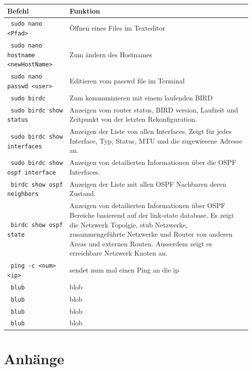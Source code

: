 \documentclass[11pt,titlepage]{article}
\begin{document}
\par\medskip 

\begin{tabular}{ |p{4cm}|p{10cm}|}
  \hline
  \textbf{Befehl} & \textbf{Funktion} \\
  \hline
  \lstinline! sudo nano <Pfad> ! & Öffnen eines Files im Texteditor \\
  \hline
  \lstinline! sudo nano hostname <newHostName>! & Zum ändern des Hostnames \\
  \hline
  \lstinline! sudo nano passwd <user> ! & Editieren vom passwd file im Terminal \\
  \hline
  \lstinline! sudo birdc ! & Zum kommunizieren mit einem laufenden BIRD \\
  \hline
  \lstinline! sudo birdc show status ! & Anzeigen vom router status, BIRD version, Laufzeit und Zeitpunkt von der letzten Rekonfiguration. \\
  \hline
  \lstinline! sudo birdc show interfaces ! & Anzeigen der Liste von allen Interfaces. Zeigt für jedes Interface, Typ, Status, MTU und die zugewiesene Adresse an.\\
  \hline
  \lstinline! sudo birdc show ospf interface ! & Anzeigen von detailierten Informationen über die OSPF Interfaces. \\
  \hline
  \lstinline! birdc show ospf neighbors ! & Anzeigen der Liste mit allen OSPF Nachbaren deren Zustand. \\
  \hline
  \lstinline! birdc show ospf state ! & Anzeigen von detailierten Informationen über OSPF Bereiche basierend auf der link-state database. Es zeigt die Netzwerk Topolgie, stub Netzwerke, zusammengeführte Netzwerke und Router von anderen Areas und externen Routen. Ausserdem zeigt es erreichbare Netzwerk Knoten an. \\
  \hline
  \lstinline! ping -c <num> <ip> ! & sendet num mal einen Ping an  die ip \\
  \hline
  \lstinline! blub ! & blob \\
  \hline
  \lstinline! blub ! & blob \\
  \hline
  \lstinline! blub ! & blob \\
  \hline
  \lstinline! blub ! & blob \\
  \hline
\end{tabular}

\section{Anhänge}
\label{sec:Anhänge}
\end{document}
